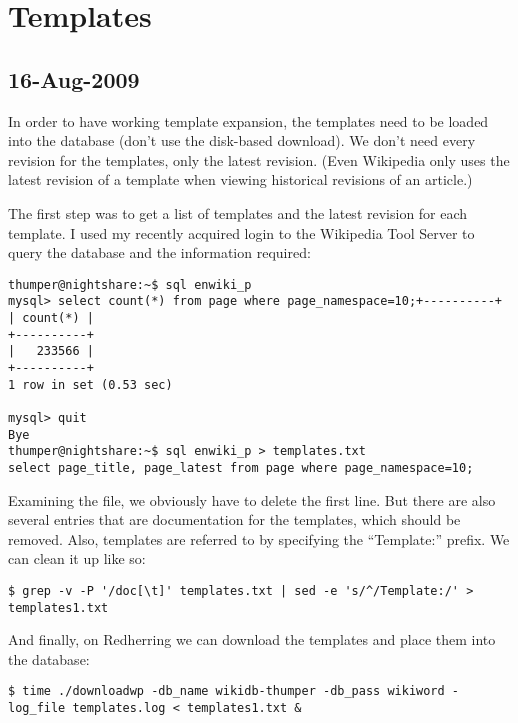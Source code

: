 \section{Templates}
\label{ch:redherring-templates}

\subsection{16-Aug-2009}

In order to have working template expansion, the templates need
to be loaded into the database (don't use the disk-based download).
We don't need every revision for the templates, only the latest revision.
(Even Wikipedia only uses the latest revision of a template when
viewing historical revisions of an article.)

The first step was to get a list of templates and the latest
revision for each template.
I used my recently acquired login to the Wikipedia Tool Server
to query the database and the information required:
\begin{verbatim}
thumper@nightshare:~$ sql enwiki_p
mysql> select count(*) from page where page_namespace=10;+----------+
| count(*) |
+----------+
|   233566 | 
+----------+
1 row in set (0.53 sec)

mysql> quit
Bye
thumper@nightshare:~$ sql enwiki_p > templates.txt
select page_title, page_latest from page where page_namespace=10;
\end{verbatim}

Examining the file, we obviously have to delete the first line.
But there are also several entries that are documentation for the templates,
which should be removed.
Also, templates are referred to by specifying the ``Template:'' prefix.
We can clean it up like so:
\begin{verbatim}
$ grep -v -P '/doc[\t]' templates.txt | sed -e 's/^/Template:/' > templates1.txt
\end{verbatim}

And finally, on Redherring we can download the templates and
place them into the database:
\begin{verbatim}
$ time ./downloadwp -db_name wikidb-thumper -db_pass wikiword -log_file templates.log < templates1.txt &
\end{verbatim}

